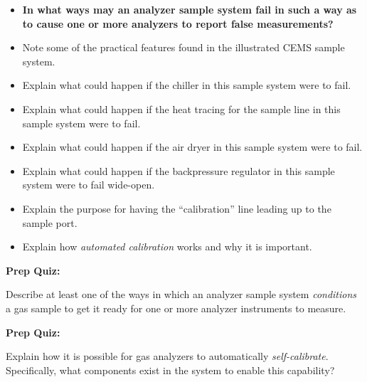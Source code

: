 \begin{itemize}
\item{} {\bf In what ways may an analyzer sample system fail in such a way as to cause one or more analyzers to report false measurements?}
\item{} Note some of the practical features found in the illustrated CEMS sample system.
\item{} Explain what could happen if the chiller in this sample system were to fail.
\item{} Explain what could happen if the heat tracing for the sample line in this sample system were to fail.
\item{} Explain what could happen if the air dryer in this sample system were to fail.
\item{} Explain what could happen if the backpressure regulator in this sample system were to fail wide-open.
\item{} Explain the purpose for having the ``calibration'' line leading up to the sample port.
\item{} Explain how {\it automated calibration} works and why it is important.
\end{itemize}








\vfil \eject

\noindent
{\bf Prep Quiz:}

Describe at least one of the ways in which an analyzer sample system {\it conditions} a gas sample to get it ready for one or more analyzer instruments to measure.









\vfil \eject

\noindent
{\bf Prep Quiz:}

Explain how it is possible for gas analyzers to automatically {\it self-calibrate}.  Specifically, what components exist in the system to enable this capability?





